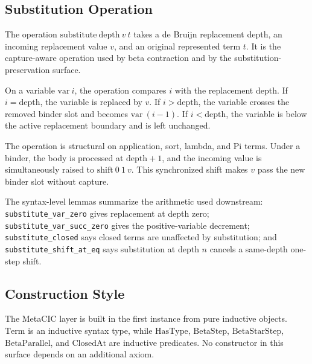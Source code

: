 \subsection{Substitution Operation}\label{subsec:reconstruction-substitution-operation}

The operation $\mathrm{substitute}\ \mathrm{depth}\ v\ t$ takes a de Bruijn
replacement depth, an incoming replacement value $v$, and an original
represented term $t$. It is the capture-aware operation used by beta
contraction and by the substitution-preservation surface.

On a variable $\mathrm{var}\ i$, the operation compares $i$ with the
replacement depth. If $i = \mathrm{depth}$, the variable is replaced by $v$.
If $i > \mathrm{depth}$, the variable crosses the removed binder slot and
becomes $\mathrm{var}\ (i-1)$. If $i < \mathrm{depth}$, the variable is below
the active replacement boundary and is left unchanged.

The operation is structural on application, sort, lambda, and Pi terms. Under
a binder, the body is processed at $\mathrm{depth}+1$, and the incoming value
is simultaneously raised to $\mathrm{shift}\ 0\ 1\ v$. This synchronized
shift makes $v$ pass the new binder slot without capture.

The syntax-level lemmas summarize the arithmetic used downstream:
\texttt{substitute\_var\_zero} gives replacement at depth zero;
\texttt{substitute\_var\_succ\_zero} gives the positive-variable decrement;
\texttt{substitute\_closed} says closed terms are unaffected by substitution;
and \texttt{substitute\_shift\_at\_eq} says substitution at depth $n$ cancels
a same-depth one-step shift.



\subsection{Construction Style}\label{subsec:reconstruction-construction-style}

The MetaCIC layer is built in the first instance from pure inductive
objects. $\mathrm{Term}$ is an inductive syntax type, while
$\mathrm{HasType}$, $\mathrm{BetaStep}$, $\mathrm{BetaStarStep}$,
$\mathrm{BetaParallel}$, and $\mathrm{ClosedAt}$ are inductive predicates.
No constructor in this surface depends on an additional axiom.

